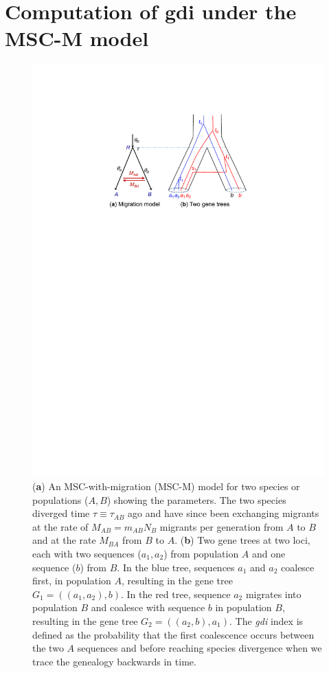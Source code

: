 \documentclass[A4]{article1}
\begin{document}
\section{Computation of gdi under the MSC-M model}

\begin{figure} [t]
   \centering %
   \includegraphics[scale=0.6]{figs/fig-tree-mscm} %
   
   \caption{(\textbf{a}) An MSC-with-migration (MSC-M) model for two species or
      populations ($A,B$) showing the parameters.  The two species diverged time $\tau
      \equiv \tau_{AB}$ ago and have since been exchanging migrants at the rate of $M_{AB}
      = m_{AB}N_B$ migrants per generation from $A$ to $B$ and at the rate $M_{BA}$ from
      $B$ to $A$.  (\textbf{b}) Two gene trees at two loci, each with two sequences ($a_1,
      a_2$) from population $A$ and one sequence ($b$) from $B$.  In the blue tree,
      sequences $a_1$ and $a_2$ coalesce first, in population $A$, resulting in the gene
      tree $G_1 = ((a_1,a_2),b)$.  In the red tree, sequence $a_2$ migrates into
      population $B$ and coalesce with sequence $b$ in population $B$, resulting in the
      gene tree $G_2 = ((a_2,b),a_1)$.  The \textit{gdi} index is defined as the
      probability that the first coalescence occurs between the two $A$ sequences and
      before reaching species divergence when we trace the genealogy backwards in time. %
   } \label{fig:tree-mscm}
\end{figure}
\end{document}
